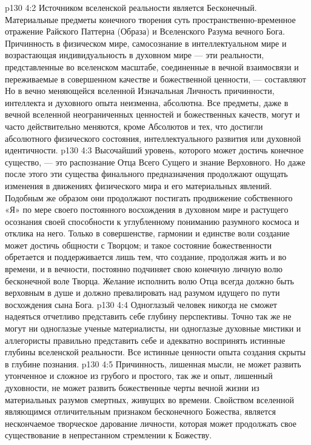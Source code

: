 \vs p130 4:2 \pc Источником вселенской реальности является Бесконечный. Материальные предметы конечного творения суть пространственно\hyp{}временное отражение Райского Паттерна (Образа) и Вселенского Разума вечного Бога. Причинность в физическом мире, самосознание в интеллектуальном мире и возрастающая индивидуальность в духовном мире --- эти реальности, представленные во вселенском масштабе, соединенные в вечной взаимосвязи и переживаемые в совершенном качестве и божественной ценности, --- составляют  Но в вечно меняющейся вселенной Изначальная Личность причинности, интеллекта и духовного опыта неизменна, абсолютна. Все предметы, даже в вечной вселенной неограниченных ценностей и божественных качеств, могут и часто действительно меняются, кроме Абсолютов и тех, что достигли абсолютного физического состояния, интеллектуального развития или духовной идентичности.
\vs p130 4:3 Высочайший уровень, которого может достичь конечное существо, --- это распознание Отца Всего Сущего и знание Верховного. Но даже после этого эти существа финального предназначения продолжают ощущать изменения в движениях физического мира и его материальных явлений. Подобным же образом они продолжают постигать продвижение собственного «Я» по мере своего постоянного восхождения в духовном мире и растущего осознания своей способности к углубленному пониманию разумного космоса и отклика на него. Только в совершенстве, гармонии и единстве воли создание может достичь общности с Творцом; и такое состояние божественности обретается и поддерживается лишь тем, что создание, продолжая жить и во времени, и в вечности, постоянно подчиняет свою конечную личную волю бесконечной воле Творца. Желание исполнить волю Отца всегда должно быть верховным в душе и должно превалировать над разумом идущего по пути восхождения сына Бога.
\vs p130 4:4 Одноглазый человек никогда не сможет надеяться отчетливо представить себе глубину перспективы. Точно так же не могут ни одноглазые ученые материалисты, ни одноглазые духовные мистики и аллегористы правильно представить себе и адекватно воспринять истинные глубины вселенской реальности. Все истинные ценности опыта создания скрыты в глубине познания.
\vs p130 4:5 Причинность, лишенная мысли, не может развить утонченное и сложное из грубого и простого, так же и опыт, лишенный духовности, не может развить божественные черты вечной жизни из материальных разумов смертных, живущих во времени. Свойством вселенной являющимся отличительным признаком бесконечного Божества, является нескончаемое творческое дарование личности, которая может продолжать свое существование в непрестанном стремлении к Божеству.

